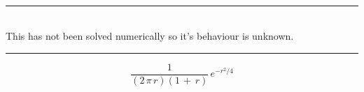\ \\
\hrule{}
\ \\
This  has not been solved numerically so it's behaviour is unknown.
\ \\
\hrule{}

\begin{equation}
\frac{1}{(2\,\pi\,r)(1\,+\,r)}\,e^{-r^2/4}
\end{equation}

